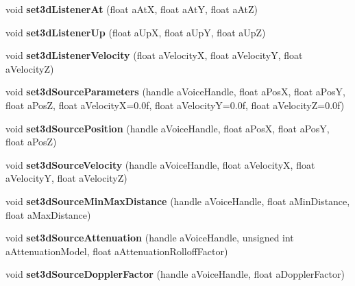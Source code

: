 \begin{DoxyCompactItemize}
void {\bfseries set3d\+Listener\+At} (float a\+AtX, float a\+AtY, float a\+AtZ)
\item 
\mbox{\label{class_so_loud_1_1_soloud_a73d76cc9ab22a2179eb0f6b463b6744a}} 
void {\bfseries set3d\+Listener\+Up} (float a\+UpX, float a\+UpY, float a\+UpZ)
\item 
\mbox{\label{class_so_loud_1_1_soloud_acaa3d925bc946965e8320ad9b50ea34e}} 
void {\bfseries set3d\+Listener\+Velocity} (float a\+VelocityX, float a\+VelocityY, float a\+VelocityZ)
\item 
\mbox{\label{class_so_loud_1_1_soloud_a3be0dac0ceb4d9580fec048746ed789b}} 
void {\bfseries set3d\+Source\+Parameters} (handle a\+Voice\+Handle, float a\+PosX, float a\+PosY, float a\+PosZ, float a\+VelocityX=0.\+0f, float a\+Velocity\+Y=0.\+0f, float a\+Velocity\+Z=0.\+0f)
\item 
\mbox{\label{class_so_loud_1_1_soloud_ac1f8eeab636353cccafdabf026495ccd}} 
void {\bfseries set3d\+Source\+Position} (handle a\+Voice\+Handle, float a\+PosX, float a\+PosY, float a\+PosZ)
\item 
\mbox{\label{class_so_loud_1_1_soloud_a367f584ad9e792a1042b1aa1ed02ad49}} 
void {\bfseries set3d\+Source\+Velocity} (handle a\+Voice\+Handle, float a\+VelocityX, float a\+VelocityY, float a\+VelocityZ)
\item 
\mbox{\label{class_so_loud_1_1_soloud_a16f6e9dc7eed886e42d3062e04615fd1}} 
void {\bfseries set3d\+Source\+Min\+Max\+Distance} (handle a\+Voice\+Handle, float a\+Min\+Distance, float a\+Max\+Distance)
\item 
\mbox{\label{class_so_loud_1_1_soloud_afa03763fb26028520a0fd4af529a0aa0}} 
void {\bfseries set3d\+Source\+Attenuation} (handle a\+Voice\+Handle, unsigned int a\+Attenuation\+Model, float a\+Attenuation\+Rolloff\+Factor)
\item 
\mbox{\label{class_so_loud_1_1_soloud_a9909a030c0a5965bd99a8d3b3751783f}} 
void {\bfseries set3d\+Source\+Doppler\+Factor} (handle a\+Voice\+Handle, float a\+Doppler\+Factor)

\end{DoxyCompactItemize}
